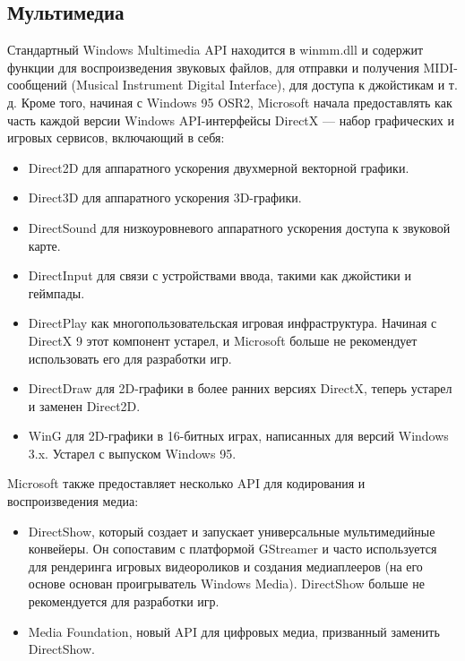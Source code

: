     \subsection{Мультимедиа}
    Стандартный Windows Multimedia API находится в winmm.dll и содержит функции для воспроизведения звуковых файлов, для отправки и получения MIDI-сообщений (Musical Instrument Digital Interface), для доступа к джойстикам и т. д.
    Кроме того, начиная с Windows 95 OSR2, Microsoft начала предоставлять как часть каждой версии Windows API-интерфейсы DirectX — набор графических и игровых сервисов, включающий в себя:

    \begin{itemize}
        \item Direct2D для аппаратного ускорения двухмерной векторной графики.
        \item Direct3D для аппаратного ускорения 3D-графики.
        \item DirectSound для низкоуровневого аппаратного ускорения доступа к звуковой карте.
        \item DirectInput для связи с устройствами ввода, такими как джойстики и геймпады.
        \item DirectPlay как многопользовательская игровая инфраструктура. Начиная с DirectX 9 этот компонент устарел, и Microsoft больше не рекомендует использовать его для разработки игр.
        \item DirectDraw для 2D-графики в более ранних версиях DirectX, теперь устарел и заменен Direct2D.
        \item WinG для 2D-графики в 16-битных играх, написанных для версий Windows 3.x. Устарел с выпуском Windows 95.
    \end{itemize}
    Microsoft также предоставляет несколько API для кодирования и воспроизведения медиа:

    \begin{itemize}
        \item DirectShow, который создает и запускает универсальные мультимедийные конвейеры. Он сопоставим с платформой GStreamer и часто используется для рендеринга игровых видеороликов и создания медиаплееров (на его основе основан проигрыватель Windows Media). DirectShow больше не рекомендуется для разработки игр.
        \item Media Foundation, новый API для цифровых медиа, призванный заменить DirectShow.
    \end{itemize}
